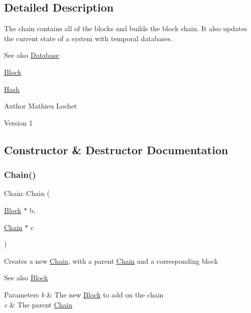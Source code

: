 \subsection{Detailed Description}
The chain contains all of the blocks and builds the block chain. It also updates the current state of a system with temporal databases. \begin{DoxySeeAlso}{See also}
\mbox{\hyperlink{classDatabase}{Database}} 

\mbox{\hyperlink{classBlock}{Block}} 

\mbox{\hyperlink{classHash}{Hash}}
\end{DoxySeeAlso}
\begin{DoxyAuthor}{Author}
Mathieu Lochet 
\end{DoxyAuthor}
\begin{DoxyVersion}{Version}
1 
\end{DoxyVersion}


\subsection{Constructor \& Destructor Documentation}
\mbox{\label{classChain_ae70c386f5d7b2e333419296545656907}} 
\subsubsection{\texorpdfstring{Chain()}{Chain()}\hspace{0.1cm}{\footnotesize\ttfamily [1/2]}}
{\footnotesize\ttfamily Chain\+::\+Chain (\begin{DoxyParamCaption}\item[{\mbox{\hyperlink{classBlock}{Block}} $\ast$}]{b,  }\item[{\mbox{\hyperlink{classChain}{Chain}} $\ast$}]{c }\end{DoxyParamCaption})}

Creates a new \mbox{\hyperlink{classChain}{Chain}}, with a parent \mbox{\hyperlink{classChain}{Chain}} and a corresponding block \begin{DoxySeeAlso}{See also}
\mbox{\hyperlink{classBlock}{Block}}
\end{DoxySeeAlso}

\begin{DoxyParams}{Parameters}
{\em b} & The new \mbox{\hyperlink{classBlock}{Block}} to add on the chain \\
\hline
{\em c} & The parent \mbox{\hyperlink{classChain}{Chain}} \\
\hline
\end{DoxyParams}
\mbox{\label{classChain_a6779b5168023552f943c54baed7e7cd4}} 
